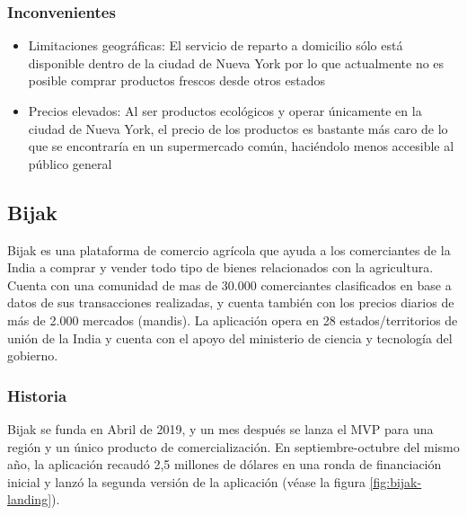 
\subsubsection{Inconvenientes}

\begin{itemize}

	\item Limitaciones geográficas: El servicio de reparto a domicilio sólo está disponible dentro de la ciudad de Nueva York por lo que actualmente no es posible comprar productos frescos desde otros estados
	
	\item Precios elevados: Al ser productos ecológicos y operar únicamente en la ciudad de Nueva York, el precio de los productos es bastante más caro de lo que se encontraría en un supermercado común, haciéndolo menos accesible al público general

\end{itemize}


\subsection{Bijak}

Bijak es una plataforma de comercio agrícola que ayuda a los comerciantes de la India a comprar y vender todo tipo de bienes relacionados con la agricultura. Cuenta con una comunidad de mas de 30.000 comerciantes clasificados en base a datos de sus transacciones realizadas, y cuenta también con los precios diarios de más de 2.000 mercados (mandis). La aplicación opera en 28 estados/territorios de unión de la India y cuenta con el apoyo del ministerio de ciencia y tecnología del gobierno.

\subsubsection{Historia}

Bijak se funda en Abril de 2019, y un mes después se lanza el MVP para una región y un único producto de comercialización. En septiembre-octubre del mismo año, la aplicación recaudó 2,5 millones de dólares en una ronda de financiación inicial y lanzó la segunda versión de la aplicación (véase la figura \ref{fig:bijak-landing}).


